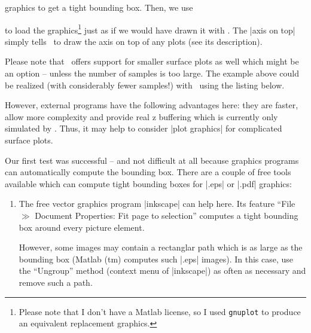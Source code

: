 \begin{addplotoperation}[]{graphics}{}
	to get a tight bounding box. Then, we use

\begin{codeexample}[]
\end{codeexample}
\noindent to load the graphics\footnote{Please note that I don't have a Matlab license, so I used \texttt{gnuplot} to produce an equivalent replacement graphics.} just as if we would have drawn it with \PGFPlots. The |axis on top| simply tells \PGFPlots\ to draw the axis on top of any plots (see its description).

Please note that \PGFPlots\ offers support for smaller surface plots as well which might be an option -- unless the number of samples is too large. The example above could be realized (with considerably fewer samples!) with \PGFPlots\ using the listing below.
\pgfplotsexpensiveexample
\begin{codeexample}[]
\end{codeexample}
\noindent However, external programs have the following advantages here: they are faster, allow more complexity and provide real z buffering which is currently only simulated by \PGFPlots. Thus, it may help to consider |plot graphics| for complicated surface plots.

Our first test was successful -- and not difficult at all because graphics programs can automatically compute the bounding box. There are a couple of free tools available which can compute tight bounding boxes for |.eps| or |.pdf| graphics:
\begin{enumerate}
	\item The free vector graphics program |inkscape| can help here. Its feature ``File $\gg$ Document Properties: Fit page to selection'' computes a tight bounding box around every picture element. 

	However, some images may contain a rectanglar path which is as large as the bounding box (Matlab (tm) computes such |.eps| images). In this case, use the ``Ungroup'' method (context menu of |inkscape|) as often as necessary and remove such a path.


\end{enumerate}
\end{addplotoperation}
